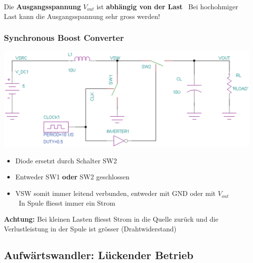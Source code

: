 \vspace{0.2cm}
Die \textbf{Ausgangsspannung} $V_{out}$ ist \textbf{abhängig von der Last} 
\textrightarrow\ Bei hochohmiger Last kann die Ausgangsspannung sehr gross werden!

\subsubsection{Synchronous Boost Converter}

\begin{minipage}{0.4\columnwidth}
    \includegraphics[width=\columnwidth]{images/synchronous_boost_converter.png}
\end{minipage}
\hfill
\begin{minipage}{0.58\columnwidth}
    \begin{itemize}
        \item Diode ersetzt durch Schalter SW2
        \item Entweder SW1 \textbf{oder} SW2 geschlossen
        \item VSW somit immer leitend verbunden, entweder mit GND oder mit $V_{out}$ \\
            \textrightarrow\ In Spule fliesst immer ein Strom
    \end{itemize}
\end{minipage}

\textbf{Achtung:} Bei kleinen Lasten fliesst Strom in die Quelle zurück und die Verlustleistung in der Spule ist grösser (Drahtwiderstand)


\subsection{Aufwärtswandler: Lückender Betrieb}

